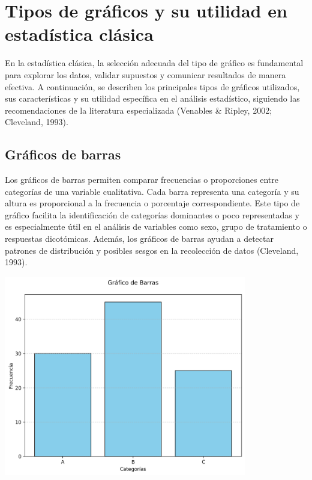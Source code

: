 \documentclass[
  spanish,
  a4paper,
  DIV=11,
  numbers=noendperiod,
  onepage,
  openany]{scrreprt}
\begin{document}
\section{Tipos de gráficos y su utilidad en estadística
clásica}\label{tipos-de-gruxe1ficos-y-su-utilidad-en-estaduxedstica-cluxe1sica}

En la estadística clásica, la selección adecuada del tipo de gráfico es
fundamental para explorar los datos, validar supuestos y comunicar
resultados de manera efectiva. A continuación, se describen los
principales tipos de gráficos utilizados, sus características y su
utilidad específica en el análisis estadístico, siguiendo las
recomendaciones de la literatura especializada (Venables \& Ripley,
2002; Cleveland, 1993).

\subsection{Gráficos de barras}\label{gruxe1ficos-de-barras}

Los gráficos de barras permiten comparar frecuencias o proporciones
entre categorías de una variable cualitativa. Cada barra representa una
categoría y su altura es proporcional a la frecuencia o porcentaje
correspondiente. Este tipo de gráfico facilita la identificación de
categorías dominantes o poco representadas y es especialmente útil en el
análisis de variables como sexo, grupo de tratamiento o respuestas
dicotómicas. Además, los gráficos de barras ayudan a detectar patrones
de distribución y posibles sesgos en la recolección de datos (Cleveland,
1993).

\begin{center}
\includegraphics[width=4.16667in,height=\textheight,keepaspectratio]{images/grafico_barras.png}
\end{center}
\end{document}
